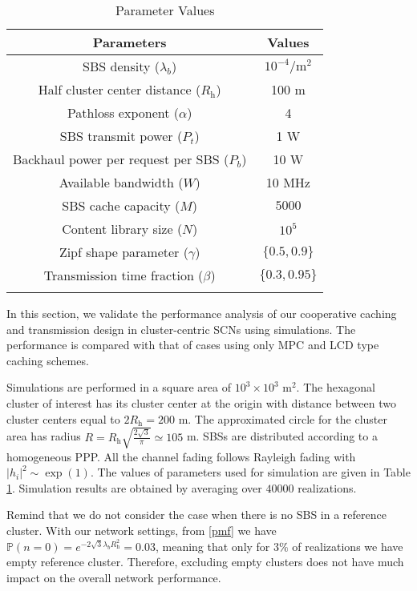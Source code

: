 \documentclass[twocolumns,10pt]{IEEEtran}
\begin{document}
\begin{table}[t]
	\centering
	\caption{Parameter Values}
	\renewcommand{\arraystretch}{1.3}
	\begin{tabular}{c|c}
		\firsthline
		\textbf{Parameters}              & \textbf{Values}  \\
		\hline   
		SBS density ($\lambda_b$) & $10^{-4} /\text{m}^{2}$      \\
		Half cluster center distance ($R_{\text{h}}$)     & 100 m\\
		Pathloss exponent ($\alpha$)     & 4     \\  
		SBS transmit power ($P_{t}$) & 1 W      \\
		Backhaul power per request per SBS ($P_{b}$)          & 10 W    \\
		Available bandwidth ($W$)          & 10 MHz    \\
		SBS cache capacity ($M$)          & $5000$     \\
		Content library size ($N$)          & $10^{5}$   \\
		Zipf shape parameter ($\gamma$)     & $\{0.5, 0.9\}$  \\
		Transmission time fraction ($\beta$)     & $\{0.3, 0.95\}$  \\
		\lasthline
	\end{tabular}
\label{system_params}
\end{table}

In this section, we validate the performance analysis of our cooperative caching and transmission design in cluster-centric SCNs using simulations. The performance is compared with that of cases using only MPC and LCD type caching schemes.

Simulations are performed in a square area of $10^{3} \times10^{3}$ m$^2$. The hexagonal cluster of interest has its cluster center at the origin with distance between two cluster centers equal to $2R_{\text{h}}=200$ m. The approximated circle for the cluster area has radius $R=R_{\text{h}} \sqrt{\frac{2\sqrt{3}}{\pi}}\simeq105$ m. SBSs are distributed according to a homogeneous PPP. All the channel fading follows Rayleigh fading with $|h_i|^{2} \sim \exp(1)$. The values of parameters used for simulation are given in Table \ref{system_params}. 
Simulation results are obtained by averaging over $40000$ realizations. 

Remind that we do not consider the case when there is no SBS in a reference cluster. With our network settings, from \eqref{pmf} we have $\mathbb{P}(n=0)=e^{-2\sqrt{3}\lambda_b R_{\text{h}}^2}=0.03$, meaning that only for $3\%$ of realizations we have empty reference cluster. Therefore, 
excluding empty clusters does not have much impact on the overall network performance.
\end{document}
